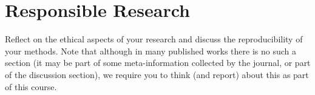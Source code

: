 \section{Responsible Research}
Reflect on the ethical aspects of your research and discuss the reproducibility of your methods.
Note that although in many published works there is no such a section (it may be part of some meta-information collected by the journal, or part of the discussion section), we require you to think (and report) about this as part of this course.